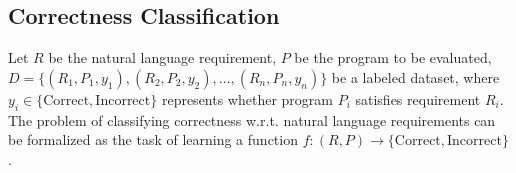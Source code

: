 \documentclass[sigconf]{acmart}
\newcommand{\projName}{HoarePrompt\xspace}
\begin{document}

\subsection{Correctness Classification}
\label{sec:classification}

Let \( R \) be the natural language requirement, \( P \) be the program to be evaluated, \( D = \{(R_1, P_1, y_1), (R_2, P_2, y_2), \dots, (R_n, P_n, y_n)\} \) be a labeled dataset, where \( y_i \in \{ \textrm{Correct}, \textrm{Incorrect} \} \) represents whether program \( P_i \) satisfies requirement \( R_i \). The problem of classifying correctness w.r.t. natural language requirements can be formalized as the task of learning a function \( f \colon (R, P) \to \{\textrm{Correct}, \textrm{Incorrect}\} \).
\end{document}
